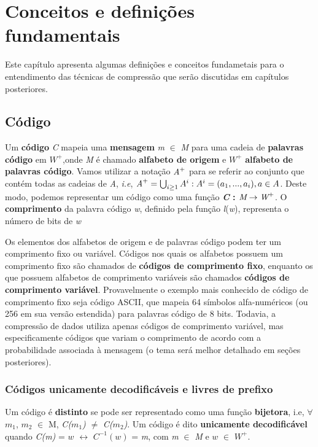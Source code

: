 \chapter{Conceitos e definições fundamentais}
Este capítulo apresenta algumas definições e conceitos fundametais para o entendimento das técnicas de compressão que serão discutidas em capítulos posteriores.

\section{Código}

Um \textbf{código} \emph{C} mapeia uma \textbf{mensagem} \emph{m} $\in$ \emph{M} para uma cadeia de \textbf{palavras código} em \emph{$W^+$},onde \emph{M} é chamado \textbf{alfabeto de origem} e \emph{$W^+$} \textbf{alfabeto de palavras código}. Vamos utilizar a notação $\emph{A}^+$ para se referir ao conjunto que contém todas as cadeias de \emph{A}, \emph{i.e}, $\emph{A}^+ = \bigcup_{i \geq 1}^{}A^{i} : A^i = (a_1,...,a_i), a \in A $. Deste modo, podemos representar um código como uma função \textbf{\emph{C} : $\emph{M} \rightarrow \emph{W}^+$}.  O \textbf{comprimento} da palavra código \emph{w}, definido pela função \emph{l}(\emph{w}), representa o número de bits de \emph{w}

Os elementos dos alfabetos de origem e de palavras código podem ter um comprimento fixo ou variável. Códigos nos quais os alfabetos possuem um comprimento fixo são chamados de \textbf{códigos de comprimento fixo}, enquanto os que possuem alfabetos de comprimento variáveis são chamados \textbf{códigos de comprimento variável}. Provavelmente o exemplo mais conhecido de código de comprimento fixo seja código ASCII, que mapeia 64 símbolos alfa-numéricos (ou 256 em sua versão estendida) para palavras código de 8 bits. Todavia, a compressão de dados utiliza apenas códigos de comprimento variável, mas especificamente códigos que variam o comprimento de acordo com a probabilidade associada à mensagem (o tema será melhor detalhado em seções posteriores). 

\subsection{Códigos unicamente decodificáveis e livres de prefixo}
Um código é \textbf{distinto} se pode ser representado como uma função \textbf{bijetora}, i.e, $\forall$ $m_1$, $m_2$ $\in$ M, \emph{C($m_1$)} $\neq$ \emph{C($m_2$)}. Um código é dito \textbf{unicamente decodificável} quando \emph{C(m)} = $w$ $\leftrightarrow$ \emph{$C^{-1}(w)$} = \emph{m}, com \emph{m} $\in$ \emph{M} e \emph{$w$} $\in$ $W^+$.

